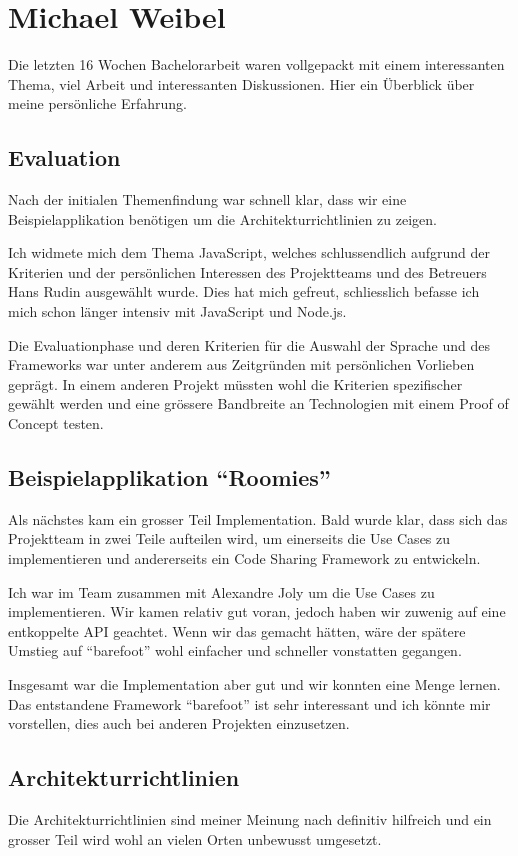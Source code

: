 \section{Michael Weibel}

Die letzten 16 Wochen Bachelorarbeit waren vollgepackt mit einem interessanten Thema, viel Arbeit und interessanten Diskussionen. Hier ein Überblick über meine persönliche Erfahrung.

\subsection*{Evaluation}
Nach der initialen Themenfindung war schnell klar, dass wir eine Beispielapplikation benötigen um die Architekturrichtlinien zu zeigen.

Ich widmete mich dem Thema JavaScript, welches schlussendlich aufgrund der Kriterien und der persönlichen Interessen des Projektteams und des Betreuers Hans Rudin ausgewählt wurde. Dies hat mich gefreut, schliesslich befasse ich mich schon länger intensiv mit JavaScript und Node.js.

Die Evaluationphase und deren Kriterien für die Auswahl der Sprache und des Frameworks war unter anderem aus Zeitgründen mit persönlichen Vorlieben geprägt. In einem anderen Projekt müssten wohl die Kriterien spezifischer gewählt werden und eine grössere Bandbreite an Technologien mit einem Proof of Concept testen.

\subsection*{Beispielapplikation ``Roomies''}
Als nächstes kam ein grosser Teil Implementation. Bald wurde klar, dass sich das Projektteam in zwei Teile aufteilen wird, um einerseits die Use Cases zu implementieren und andererseits ein Code Sharing Framework zu entwickeln.

Ich war im Team zusammen mit Alexandre Joly um die Use Cases zu implementieren. Wir kamen relativ gut voran, jedoch haben wir zuwenig auf eine entkoppelte API geachtet. Wenn wir das gemacht hätten, wäre der spätere Umstieg auf ``barefoot'' wohl einfacher und schneller vonstatten gegangen.

Insgesamt war die Implementation aber gut und wir konnten eine Menge lernen. Das entstandene Framework ``barefoot'' ist sehr interessant und ich könnte mir vorstellen, dies auch bei anderen Projekten einzusetzen.

\subsection*{Architekturrichtlinien}
Die Architekturrichtlinien sind meiner Meinung nach definitiv hilfreich und ein grosser Teil wird wohl an vielen Orten unbewusst umgesetzt.

